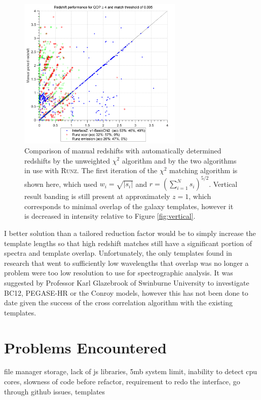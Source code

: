 \documentclass[titlesmallcaps, examinerscopy, copyrightpage]{uqthesis}
\newcommand{\runz}{\textsc{Runz}}
\newcommand{\brac}[1]{\left( #1 \right)}
\newcommand\abs[1]{\left|#1\right|}
\begin{document}
\begin{figure}[ht!]
\includegraphics[width=0.7\textwidth]{images/Fullv1-BasicChi2.png} 
\centering
\caption{Comparison of manual redshifts with automatically determined redshifts by the unweighted $\chi^2$ algorithm and by the two algorithms in use with \runz{}. The first iteration of the $\chi^2$ matching algorithm is shown here, which used $w_i = \sqrt{\abs{s_i}}$ and $r = \brac{\sum_{i=1}^N s_i}^{5/2}$. Vertical result banding is still present at approximately $z=1$, which corresponds to minimal overlap of the galaxy templates, however it is decreased in intensity relative to Figure \ref{fig:vertical}.}
\label{fig:novertical}
\end{figure}

I better solution than a tailored reduction factor would be to simply increase the template lengths so that high redshift matches still have a significant portion of spectra and template overlap. Unfortunately, the only templates found in research that went to sufficiently low wavelengths that overlap was no longer a problem were too low resolution to use for spectrographic analysis. It was suggested by Professor Karl Glazebrook of Swinburne University to investigate BC12, PEGASE-HR or the Conroy models, however this has not been done to date given the success of the cross correlation algorithm with the existing templates.

\section{Problems Encountered}

file manager storage, lack of js libraries, 5mb system limit, inability to detect cpu cores, slowness of code before refactor, requirement to redo the interface, go through github issues, templates
\end{document}
